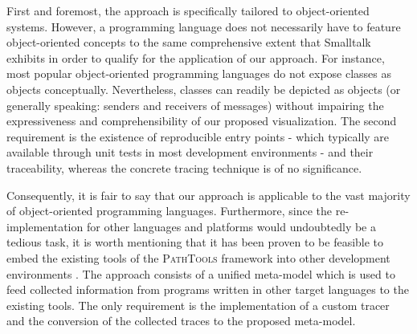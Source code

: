 First and foremost, the approach is specifically tailored to object-oriented systems.
However, a programming language does not necessarily have to feature object-oriented concepts to the same comprehensive extent that Smalltalk exhibits in order to qualify for the application of our approach.
For instance, most popular object-oriented programming languages do not expose classes as objects conceptually. 
Nevertheless, classes can readily be depicted as objects (or generally speaking: senders and receivers of messages) without impairing the expressiveness and comprehensibility of our proposed visualization.
The second requirement is the existence of reproducible entry points - which typically are available through unit tests in most development environments - and their traceability, whereas the concrete tracing technique is of no significance.

Consequently, it is fair to say that our approach is applicable to the vast majority of object-oriented programming languages.
Furthermore, since the re-implementation for other languages and platforms would undoubtedly be a tedious task, it is worth mentioning that it has been proven to be feasible to embed the existing tools of the \textsc{PathTools} framework into other development environments \cite{richter_awesome_2013}.
The approach consists of a unified meta-model which is used to feed collected information from programs written in other target languages to the existing tools.
The only requirement is the implementation of a custom tracer and the conversion of the collected traces to the proposed meta-model.
